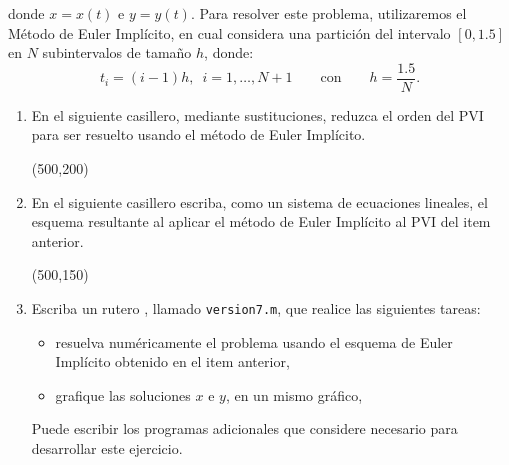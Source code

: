 \documentclass[legalpaper,11pt]{article}
\begin{document}
\begin{enumerate}
\noindent donde $x=x(t)$ e $y=y(t)$. Para resolver este problema, utilizaremos el M\'etodo de Euler Impl\'icito, en cual considera una partici\'on del intervalo $[0, 1{.}5]$ en $N$ subintervalos de tama\~no $h$, donde:
$$t_i=(i-1)h,\,\,\,i=1,\ldots,N+1\qquad \textrm{con} \qquad h=\dfrac{1{.}5}{N}. $$
  \begin{enumerate}
 \item {} En el siguiente casillero, mediante sustituciones, reduzca el orden del PVI para ser resuelto usando el m\'etodo de Euler Impl\'icito.

\hspace{-10mm}
\framebox(500,200){}

\item {} En el siguiente casillero escriba, como un sistema de ecuaciones lineales, el esquema resultante al aplicar el m\'etodo de Euler Impl\'icito al PVI del item anterior.

\hspace{-10mm}
\framebox(500,150){}

\item  Escriba un rutero \matlab, llamado \verb"version7.m", que realice las siguientes tareas:
\begin{itemize}
\item {} resuelva num\'ericamente el problema usando el esquema de Euler Impl\'icito obtenido en el item anterior,
\item {} grafique las soluciones $x$ e $y$, en un mismo gr\'afico,
\end{itemize}
Puede escribir los programas adicionales que considere necesario para desarrollar este ejercicio.
 \end{enumerate}
\end{enumerate}
\end{document}
